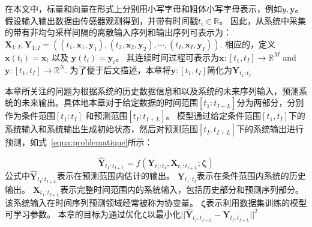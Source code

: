 在本文中，标量和向量在形式上分别用小写字母和粗体小写字母表示，例如$y, \boldsymbol y$。假设输入输出数据由传感器观测得到，并带有时间戳$t_i\in \mathbb{R}$。
因此，从系统中采集的带有非均匀采样间隔的离散输入序列和输出序列可表示为：
$\boldsymbol X_{1:I},\boldsymbol Y_{1:I}= ((t_1,\boldsymbol x_1,\boldsymbol y_1),(t_2,\boldsymbol x_2, \boldsymbol y_2),\cdots,(t_I,\boldsymbol x_I,\boldsymbol y_I))$. 
相应的，定义$\boldsymbol x(t_i)=\boldsymbol x_i$ 以及 $\boldsymbol y(t_i)=\boldsymbol y_i$。
其连续时间过程可表示为$\boldsymbol x:\left[t_{1}, t_{I}\right] \rightarrow \mathbb{R}^{M}$ and $\boldsymbol y:\left[t_{1}, t_{I}\right] \rightarrow \mathbb{R}^{N}$.
为了便于后文描述，本章将$\boldsymbol y:\left[t_{1}, t_{I}\right]$简化为$\boldsymbol Y_{t_1:t_I}$

本章所关注的问题为根据系统的历史数据信息和以及系统的未来序列输入，预测系统的未来输出。具体地本章对于给定数据的时间范围$[t_1:t_{I+L}]$分为两部分，分别作为条件范围$[t_1:t_{I}]$ 和预测范围$[t_{I}:t_{I+L}]$。
模型通过给定条件范围$[t_1, t_I]$下的系统输入和系统输出生成初始状态，然后对预测范围$[t_{I}, t_{I+L}]$下的系统输出进行预测，如式~\ref{equa:problematique}所示：

\begin{equation}
\label{equa:problematique}
    \hat{\boldsymbol Y}_{t_{I}:t_{I+L}} = f(\boldsymbol Y_{t_{1}:t_{I}}, \boldsymbol X_{t_{1}:t_{I+L}};\boldsymbol \zeta) 
\end{equation}
公式中$\hat{\boldsymbol Y}_{t_{I}:t_{I+L}}$表示在预测范围内估计的输出。 
$\boldsymbol Y_{t_{1}:t_{I}}$表示在条件范围内系统的历史输出。
$\boldsymbol X_{t_{1}:t_{I+L}}$表示完整时间范围内的系统输入，包括历史部分和预测序列部分。该系统输入在时间序列预测领域经常被称为协变量\cite{Wu2020}。
$\boldsymbol \zeta$表示利用数据集训练的模型可学习参数。
本章的目标为通过优化$\boldsymbol \zeta$以最小化$||\hat{\boldsymbol Y}_{t_{I}:t_{I+L}}-\boldsymbol {Y}_{t_{I}:t_{I+L}}||^2$

